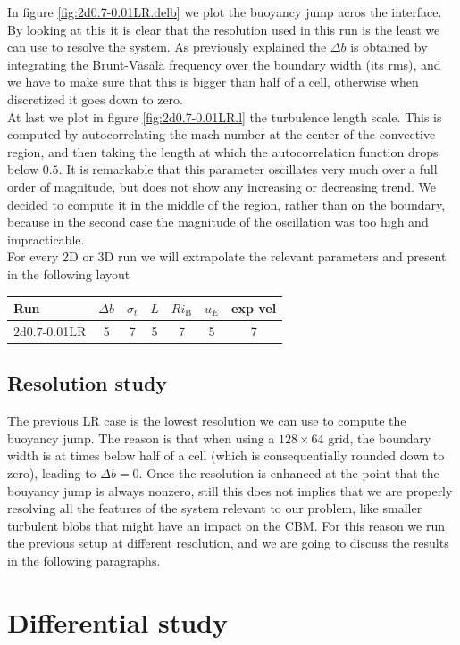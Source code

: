   In figure \ref{fig:2d0.7-0.01LR.delb} we plot the buoyancy jump acros the interface. By looking at this it is clear that the resolution used in this run is the least we can use to resolve the system. As previously explained the $\Delta b$ is obtained by integrating the Brunt-Väsälä frequency over the boundary width (its rms), and we have to make sure that this is bigger than half of a cell, otherwise when discretized it goes down to zero. \\
At last we plot in figure \ref{fig:2d0.7-0.01LR.l} the turbulence length scale. This is computed by autocorrelating the mach number at the center of the convective region, and then taking the length at which the autocorrelation function drops below $0.5$. It is remarkable that this parameter oscillates very much over a full order of magnitude, but does not show any increasing or decreasing trend. We decided to compute it in the middle of the region, rather than on the boundary, because in the second case the magnitude of the oscillation was too high and impracticable. \\
For every 2D or 3D run we will extrapolate the relevant parameters and present in the following layout
\begin{center}
 \begin{tabular}{|l|c|c|c|c|c|c|}
	  \hline
	  Run & $\Delta b$ & $\sigma_t$ & $L$ & $Ri_{\mathrm{B}}$ & $u_E$ & exp vel\\
	  	\hline
		2d0.7-0.01LR & 5 & 7& 5 & 7& 5 & 7 \\ 
	      \hline
      \end{tabular}
 \end{center}

\subsection{Resolution study}
The previous LR case is the lowest resolution we can use to compute the buoyancy jump. The reason is that when using a $128 \times 64$ grid, the boundary width is at times below half of a cell (which is consequentially rounded down to zero), leading to $\Delta b =0$. Once the resolution is enhanced at the point that the bouyancy jump is always nonzero, still this does not implies that we are properly resolving all the features of the system relevant to our problem, like smaller turbulent blobs that might have an impact on the CBM. For this reason we run the previous setup at different resolution, and we are going to discuss the results in the following paragraphs.

\section{Differential study}
